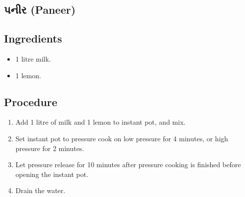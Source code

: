 \documentclass[../../recipes.tex]{subfiles}
\begin{document}
\begin{gujarati}

\chapter{પનીર (Paneer)}

\section*{Ingredients}

\begin{itemize}
    \item 1 litre milk.
    \item 1 lemon.
\end{itemize}

\noindent
\section*{Procedure}

\begin{enumerate}
    \item Add 1 litre of milk and 1 lemon to instant pot, and mix.
    \item Set instant pot to pressure cook on low pressure for 4 minutes, or high pressure for 2 minutes.
    \item Let pressure release for 10 minutes after pressure cooking is finished before opening the instant pot.
    \item Drain the water.
\end{enumerate}

\end{gujarati}
\end{document}
